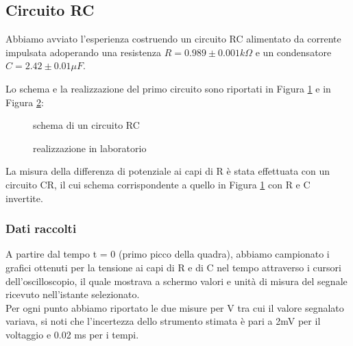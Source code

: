 \documentclass[a4paper]{article}
\theoremstyle{definition}
\begin{document}
\subsection{Circuito RC}

Abbiamo avviato l'esperienza costruendo un circuito RC alimentato da corrente impulsata adoperando una resistenza \(R = 0.989 \pm 0.001 k\Omega\) e un condensatore \(C = 2.42 \pm 0.01 \mu F\). 

\noindent Lo schema e la realizzazione del primo circuito sono riportati in Figura \ref{fig:RC_schema} e in Figura \ref{fig:RC_foto}:

\begin{figure}[!ht]

	\caption{schema di un circuito RC}

    \label{fig:RC_schema}

\end{figure}

\begin{figure}[!h]
\hfill
{}
\hfill
{}
\hfill
\caption{realizzazione in laboratorio}
\label{fig:RC_foto}
\end{figure}

\noindent La misura della differenza di potenziale ai capi di R è stata effettuata con un circuito CR, il cui schema corrispondente a quello in Figura \ref{fig:RC_schema} con R e C invertite. \\

\subsubsection*{Dati raccolti}
A partire dal tempo t = 0 (primo picco della quadra), abbiamo campionato i grafici ottenuti per la tensione ai capi di R e di C nel tempo attraverso i cursori dell'oscilloscopio, il quale mostrava a schermo valori e unità di misura del segnale ricevuto nell'istante selezionato. \\

\noindent Per ogni punto abbiamo riportato le due misure per V tra cui il valore segnalato variava, si noti che l'incertezza dello strumento stimata è pari a 2mV per il voltaggio e 0.02 ms per i tempi.
\end{document}
